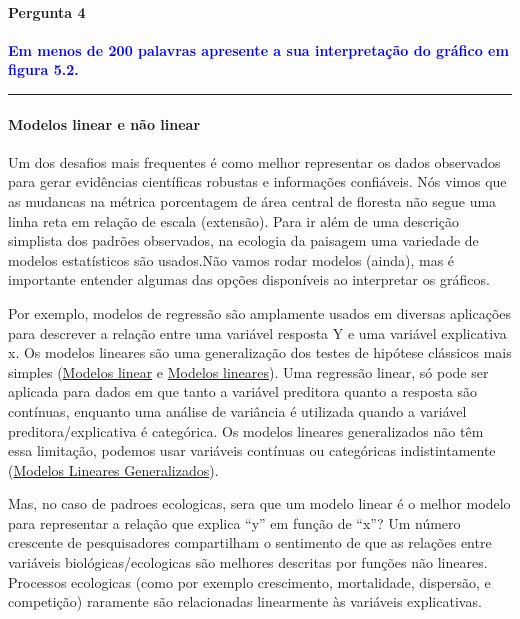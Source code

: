 \documentclass[
]{article}
\begin{document}
\hypertarget{pergunta-4-1}{%
\paragraph{Pergunta 4}\label{pergunta-4-1}}

\textcolor{blue}{\textbf{Em menos de 200 palavras apresente a sua interpretação do gráfico em figura 5.2.}}

\begin{center}\rule{0.5\linewidth}{0.5pt}\end{center}

\newpage

\hypertarget{modelos-linear-e-nuxe3o-linear}{%
\paragraph{Modelos linear e não linear}\label{modelos-linear-e-nuxe3o-linear}}

Um dos desafios mais frequentes é como melhor representar os dados observados para gerar evidências científicas robustas e informações confiáveis. Nós vimos que as mudancas na métrica porcentagem de área central de floresta não segue uma linha reta em relação de escala (extensão). Para ir além de uma descrição simplista dos padrões observados, na ecologia da paisagem uma variedade de modelos estatísticos são usados.Não vamos rodar modelos (ainda), mas é importante entender algumas das opções disponíveis ao interpretar os gráficos.

Por exemplo, modelos de regressão são amplamente usados em diversas aplicações
para descrever a relação entre uma variável resposta Y e uma variável
explicativa x. Os modelos lineares são uma generalização dos testes de hipótese clássicos mais simples (\href{http://sillasgonzaga.com/material/cdr/modelos.html\#modelo-linear}{Modelos linear} e \href{https://analises-ecologicas.com/cap7.html}{Modelos lineares}). Uma regressão linear, só pode ser aplicada para dados em que tanto a variável preditora quanto a resposta são contínuas, enquanto uma análise de variância é utilizada quando a variável preditora/explicativa é categórica. Os modelos lineares generalizados não têm essa limitação, podemos usar variáveis contínuas ou categóricas indistintamente (\href{https://analises-ecologicas.com/cap8.html}{Modelos Lineares Generalizados}).

Mas, no caso de padroes ecologicas, sera que um modelo linear é o melhor modelo para representar a relação que explica ``y'' em função de ``x''? Um número crescente de pesquisadores compartilham o sentimento de que as relações entre variáveis biológicas/ecologicas são melhores descritas por funções não lineares. Processos ecologicas (como por exemplo crescimento, mortalidade, dispersão, e competição) raramente são relacionadas linearmente às variáveis explicativas.
\end{document}
